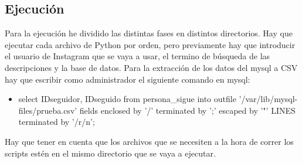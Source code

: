 \subsection{Ejecución}
Para la ejecución he dividido las distintas fases en distintos directorios.
Hay que ejecutar cada archivo de Python por orden, pero previamente hay que introducir el usuario de Instagram que se vaya a usar, el termino de búsqueda de las descripciones y la base de datos.
Para la extracción de los datos del mysql a CSV hay que escribir como administrador el siguiente comando en mysql:
\begin{itemize}
    \item select IDseguidor, IDseguido from persona\_sigue into outfile '/var/lib/mysql-files/prueba.csv' fields enclosed by '/' terminated by ';' escaped by '"' LINES terminated by '/r/n';
\end{itemize}

Hay que tener en cuenta que los archivos que se necesiten a la hora de correr los scripts estén en el mismo directorio que se vaya a ejecutar.



